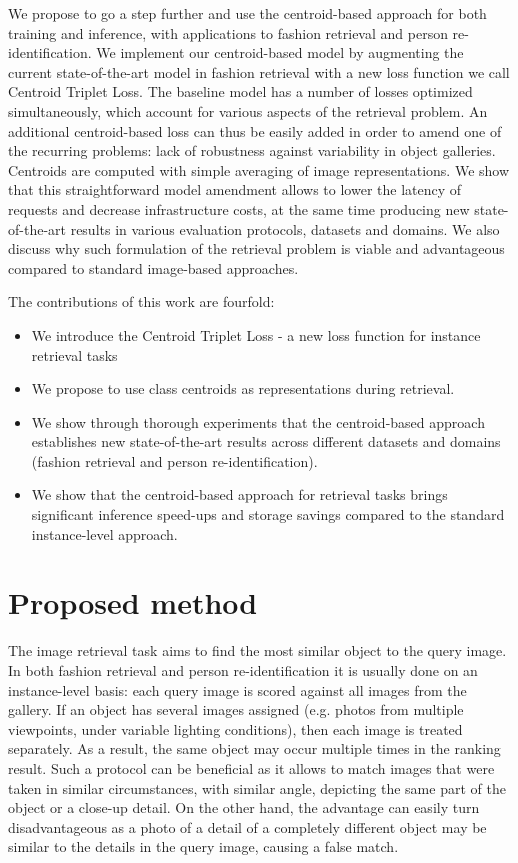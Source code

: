 \documentclass[sigconf,nonacm]{acmart}
\begin{document}
We propose to go a step further and use the centroid-based approach for both training and inference, with applications to fashion retrieval and person re-identification. We implement our centroid-based model by augmenting the current state-of-the-art model in fashion retrieval  \cite{Wieczorek2020} with a new loss function we call Centroid Triplet Loss. The baseline model has a number of losses optimized simultaneously, which account for various aspects of the retrieval problem. An additional centroid-based loss can thus be easily added in order to amend one of the recurring problems: lack of robustness against variability in object galleries. Centroids are computed with simple averaging of image representations. We show that this straightforward model amendment allows to lower the latency of requests and decrease infrastructure costs, at the same time producing new state-of-the-art results in various evaluation protocols, datasets and domains.
We also discuss why such formulation of the retrieval problem is viable and advantageous compared to standard image-based approaches.

The contributions of this work are fourfold:
\begin{itemize}
    \item We introduce the Centroid Triplet Loss - a new loss function for instance retrieval tasks
    \item We propose to use class centroids as representations during retrieval.
    \item We show through thorough experiments that the centroid-based approach establishes new state-of-the-art results across different datasets and domains (fashion retrieval and person re-identification).
    \item We show that the centroid-based approach for retrieval tasks brings significant inference speed-ups and storage savings compared to the standard instance-level approach.
\end{itemize}


\section{Proposed method}

The image retrieval task aims to find the most similar object to the query image. In both fashion retrieval and person re-identification it is usually done on an instance-level basis: each query image is scored against all images from the gallery. If an object has several images assigned (e.g. photos from multiple viewpoints, under variable lighting conditions), then each image is treated separately. As a result, the same object may occur multiple times in the ranking result. Such a protocol can be beneficial as it allows to match images that were taken in similar circumstances, with similar angle, depicting the same part of the object or a close-up detail. On the other hand, the advantage can easily turn disadvantageous as a photo of a detail of a completely different object may be similar to the details in the query image, causing a false match.
\end{document}
